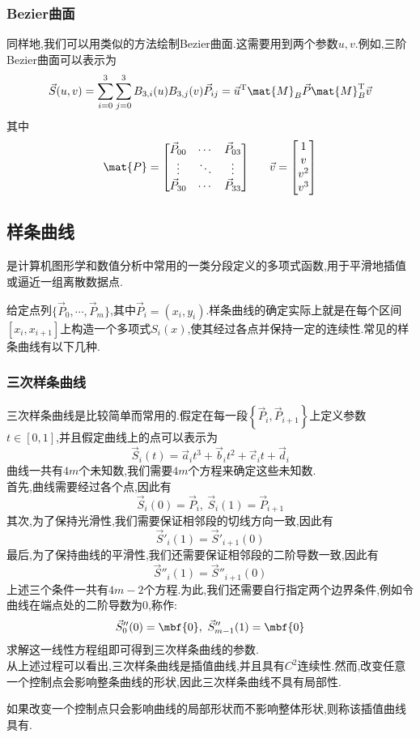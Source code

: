 \documentclass{ctexart}
\begin{document}
\subsubsection{Bezier曲面}
同样地,我们可以用类似的方法绘制Bezier曲面.这需要用到两个参数$u,v$.例如,三阶Bezier曲面可以表示为
\[\vec{S}(u,v)=\sum_{i=0}^{3}\sum_{j=0}^{3}B_{3,i}(u)B_{3,j}(v)\vec{P}_{ij}=\vec{u}^{\text{T}}\mat{M}_B\vec{P}\mat{M}_B^{\text{T}}\vec{v}\]
其中
\[\mat{P}=\begin{bmatrix}
    \vec{P}_{00}&\cdots&\vec{P}_{03}\\
    \vdots&\ddots&\vdots\\
    \vec{P}_{30}&\cdots&\vec{P}_{33}
\end{bmatrix}\ \ \ \ \ \vec{v}=\begin{bmatrix}
    1\\v\\v^2\\v^3
\end{bmatrix}\]
\subsection{样条曲线}
\begin{definition}[样条曲线]
    是计算机图形学和数值分析中常用的一类分段定义的多项式函数,用于平滑地插值或逼近一组离散数据点.
\end{definition}
给定点列$\{\vec{P}_0,\cdots,\vec{P}_m\}$,其中$\vec{P}_i=\left(x_i,y_i\right)$.样条曲线的确定实际上就是在每个区间$[x_i,x_{i+1}]$上构造一个多项式$S_i(x)$,使其经过各点并保持一定的连续性.常见的样条曲线有以下几种.
\subsubsection{三次样条曲线}
三次样条曲线是比较简单而常用的.假定在每一段$\left\{\vec{P}_i,\vec{P}_{i+1}\right\}$上定义参数$t\in[0,1]$,并且假定曲线上的点可以表示为
\[\vec{S}_i(t)=\vec{a}_it^3+\vec{b}_it^2+\vec{c}_it+\vec{d}_i\]
曲线一共有$4m$个未知数,我们需要$4m$个方程来确定这些未知数.\\
\indent 首先,曲线需要经过各个点,因此有
\[\vec{S}_i(0)=\vec{P}_i,\ \vec{S}_i(1)=\vec{P}_{i+1}\]
其次,为了保持光滑性,我们需要保证相邻段的切线方向一致,因此有
\[\vec{S}'_i(1)=\vec{S}'_{i+1}(0)\]
最后,为了保持曲线的平滑性,我们还需要保证相邻段的二阶导数一致,因此有
\[\vec{S}''_i(1)=\vec{S}''_{i+1}(0)\]
上述三个条件一共有$4m-2$个方程.为此,我们还需要自行指定两个边界条件,例如令曲线在端点处的二阶导数为$0$,称作:
\[\vec{S}''_0(0)=\mbf{0},\ \vec{S}''_{m-1}(1)=\mbf{0}\]
求解这一线性方程组即可得到三次样条曲线的参数.\\
\indent 从上述过程可以看出,三次样条曲线是插值曲线,并且具有$C^2$连续性.然而,改变任意一个控制点会影响整条曲线的形状,因此三次样条曲线不具有局部性.
\begin{definition}[局部性]
    如果改变一个控制点只会影响曲线的局部形状而不影响整体形状,则称该插值曲线具有.
\end{definition}
\end{document}
